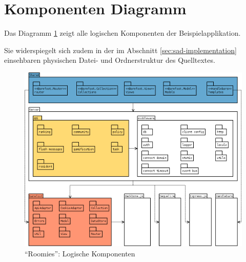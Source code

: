 \section{Komponenten Diagramm}

Das Diagramm \ref{dig:sad-components} zeigt alle logischen Komponenten der Beispielapplikation.

Sie widerspiegelt sich zudem in der im Abschnitt \ref{sec:sad-implementation} einsehbaren physischen Datei- und Ordnerstruktur des Quelltextes.

\begin{figure}[ht]
	\includegraphics[width=\textwidth]{content/sad/diagrams/component-diagram.png}
	\caption{``Roomies'': Logische Komponenten}
	\label{dig:sad-components}
\end{figure}